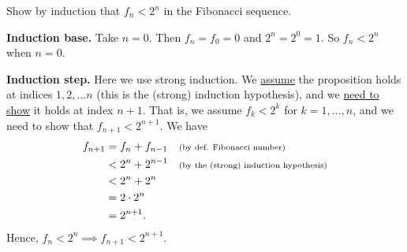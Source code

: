 \documentclass[10pt]{beamer}
\begin{document}
\begin{frame}
\small 
\begin{mygreenbox}[title=Exercise 3]
Show by induction that $f_n < 2^n$ in the Fibonacci sequence. 
\end{mygreenbox}

\vfill \vfill 
\begin{myyellowbox}[title=Solution]
\textbf{Induction base.} Take $n=0$.  Then $f_n = f_0 = 0$  and  $2^n =2^0 =1$. So $f_n < 2^n$ when $n=0$.

\vspace{0.25cm}

\textbf{Induction step.} Here we use strong induction. We \underline{assume} the proposition holds at indices $1, 2, \hdots n$ (this is the \alert{(strong) induction hypothesis}), and we \underline{need to show} it holds at index $n+1$.  That is, we assume $f_k < 2^k$ for $k=1,\hdots, n$, and we need to show that $f_{n+1} < 2^{n+1}$.  We have
%
\begin{align*}
f_{n+1} &= f_n + f_{n-1} && \text{\scriptsize{{(by def. Fibonacci number)}}}	\\
&< 2^n + 2^{n-1} && \text{\scriptsize{{(by the (strong) induction hypothesis)}}} \\
&< 2^n + 2^n  && \\
&= 2 \cdot 2^n  \\
&= 2^{n+1}.
\end{align*}
Hence, $f_n < 2^n \implies f_{n+1} < 2^{n+1}$.
\end{myyellowbox}
	
\end{frame}
\end{document}
